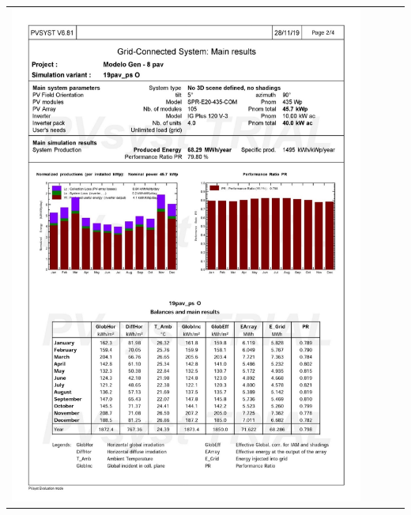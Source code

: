\begin{table}[H]
    \centering
    \begin{tabular}{l}
        \includegraphics[width=0.9\textwidth]{figures/attachments/resultpv34.jpg}
    \end{tabular}
\end{table}